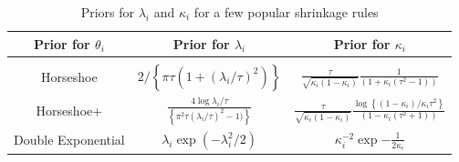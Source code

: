 \documentclass[sts,preprint]{imsart}
\begin{document}
\begin{table}[!ht]
\centering
\caption{Priors for $\lambda_i$ and $\kappa_i$ for a few popular shrinkage rules}
\begin{tabular}{ccc}
\hline
Prior for $\theta_i$ & Prior for $\lambda_i$ & Prior for $\kappa_i$ \\ 
\hline \\
Horseshoe & $2/ \left\{ \pi \tau (1 + (\lambda_i/\tau)^2 )\right\}$  & $\frac{\tau}{\sqrt{\kappa_i (1-\kappa_i )}} \frac{1}{(1+\kappa_i (\tau^2 -1 ) )}$ \\[10pt]
Horseshoe+ & $\frac{4\log \lambda_i/\tau}{\left\{{\pi^2 \tau}(\lambda_i/\tau)^2 -1)\right\}}$ &  $\frac{\tau}{\sqrt{\kappa_i (1-\kappa_i )}}\frac{\log \left \{ ( 1 - \kappa_i ) / \kappa_i \tau^2 \right \}}{ (1-\kappa_i (\tau^2 +1 ))}$ \\[10pt]
Double Exponential & $\lambda_i \exp (-\lambda_i^2/2)$ & $\kappa_i^{-2} \exp{-\frac{1}{2\kappa_i}}$ \\
\hline 
\end{tabular}
\end{table}
\end{document}
